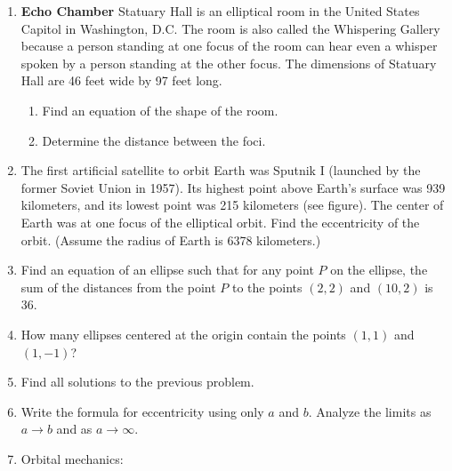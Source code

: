 \documentclass[11pt]{article}
\begin{document}
\begin{enumerate}
\def\labelenumi{\arabic{enumi}.}
\setcounter{enumi}{5}

\item
  \textbf{Echo Chamber} Statuary Hall is an elliptical room in the United States Capitol in
  Washington, D.C. The room is also called the Whispering Gallery
  because a person standing at one focus of the room can hear even a
  whisper spoken by a person standing at the other focus. The dimensions
  of Statuary Hall are 46 feet wide by 97 feet long.

  \begin{enumerate}

  \item
    Find an equation of the shape of the room.
  \item
    Determine the distance between the foci.
  \end{enumerate}
\item
  The first artificial satellite to orbit Earth was Sputnik I (launched
  by the former Soviet Union in 1957). Its highest point above Earth's
  surface was 939 kilometers, and its lowest point was 215 kilometers
  (see figure). The center of Earth was at one focus of the elliptical
  orbit. Find the eccentricity of the orbit. (Assume the radius of Earth
  is 6378 kilometers.)
\item
  Find an equation of an ellipse such that for any point \(P\) on the
  ellipse, the sum of the distances from the point \(P\) to the points
  \((2, 2)\) and \((10, 2)\) is 36.
\item
  How many ellipses centered at the origin contain the points \((1,1)\)
  and \((1,-1)\)?
\item
  Find all solutions to the previous problem.
\item
  Write the formula for eccentricity using only \(a\) and \(b\). Analyze
  the limits as \(a \to b\) and as \(a \to \infty\).
\item
  Orbital mechanics:

  \begin{enumerate}


\end{enumerate}
\end{enumerate}
\end{document}
